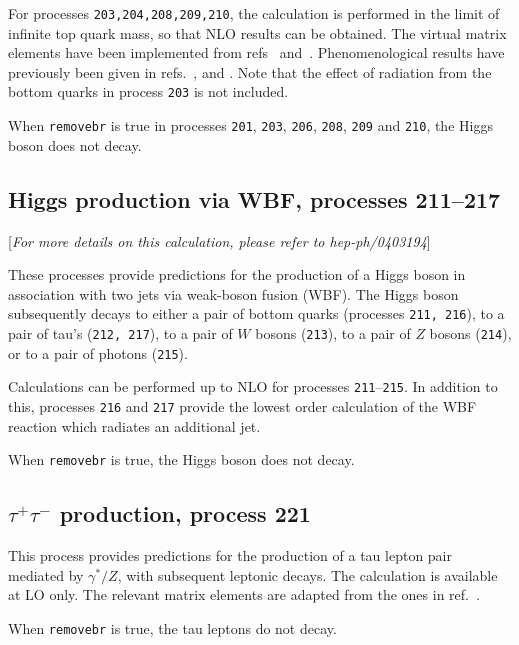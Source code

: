 \documentclass[12pt]{article}
\begin{document}
For processes {\tt 203,204,208,209,210}, the calculation is performed in the
limit of infinite top quark mass, so that NLO results can be obtained.
The virtual matrix elements have been implemented from
refs~\cite{Ravindran:2002dc} and~\cite{Schmidt:1997wr}.
Phenomenological results have previously been 
given in refs.~\cite{deFlorian:1999zd},\cite{Ravindran:2002dc} 
and \cite{Glosser:2002gm}.
Note that the effect of radiation from the bottom quarks in process {\tt 203}
is not included.

When {\tt removebr} is true in processes {\tt 201}, {\tt 203}, {\tt 206}, {\tt 208}, {\tt 209}
and {\tt 210}, the Higgs boson does not decay.

\subsection{Higgs production via WBF, processes 211--217}
\label{subsec:wbf}

\begin{center}
[{\it For more details on this calculation, please refer to hep-ph/0403194}]
\end{center}

These processes provide predictions for the production of a Higgs boson in
association with two jets via weak-boson fusion (WBF). The Higgs boson
subsequently decays to either a pair of bottom quarks
(processes {\tt 211, 216}), to a pair of tau's ({\tt 212, 217}), 
to a pair of $W$ bosons ({\tt 213}),
to a pair of $Z$ bosons ({\tt 214}),
or to a pair of photons ({\tt 215}).

Calculations can be performed up to NLO for processes {\tt 211}--{\tt 215}.
In addition to this, processes {\tt 216} and {\tt 217} provide the lowest
order calculation of the WBF reaction which radiates an additional jet. 

When {\tt removebr} is true, the Higgs boson does not decay.

\subsection{$\tau^+\tau^-$ production, process 221}
\label{subsec:tautau}

This process provides predictions for the production of a tau lepton
pair mediated by $\gamma^*/Z$, with subsequent leptonic decays. The calculation is available at LO
only. The relevant matrix elements are adapted from the ones in
ref.~\cite{Kleiss:1988xr}.

When {\tt removebr} is true, the tau leptons do not decay.
\end{document}
